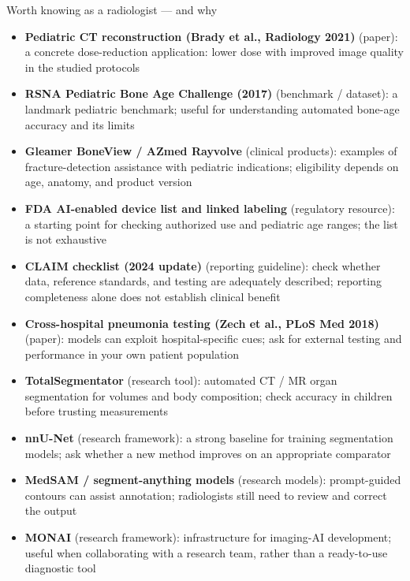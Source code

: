 \documentclass[aspectratio=169]{beamer}
\begin{document}
\begin{frame}{Worth knowing as a radiologist --- and why}
\scriptsize
\begin{itemize}
\item \textbf{Pediatric CT reconstruction (Brady et al., Radiology 2021)} (paper): a concrete dose-reduction application: lower dose with improved image quality in the studied protocols
\item \textbf{RSNA Pediatric Bone Age Challenge (2017)} (benchmark / dataset): a landmark pediatric benchmark; useful for understanding automated bone-age accuracy and its limits
\item \textbf{Gleamer BoneView / AZmed Rayvolve} (clinical products): examples of fracture-detection assistance with pediatric indications; eligibility depends on age, anatomy, and product version
\item \textbf{FDA AI-enabled device list and linked labeling} (regulatory resource): a starting point for checking authorized use and pediatric age ranges; the list is not exhaustive
\item \textbf{CLAIM checklist (2024 update)} (reporting guideline): check whether data, reference standards, and testing are adequately described; reporting completeness alone does not establish clinical benefit
\item \textbf{Cross-hospital pneumonia testing (Zech et al., PLoS Med 2018)} (paper): models can exploit hospital-specific cues; ask for external testing and performance in your own patient population
\item \textbf{TotalSegmentator} (research tool): automated CT / MR organ segmentation for volumes and body composition; check accuracy in children before trusting measurements
\item \textbf{nnU-Net} (research framework): a strong baseline for training segmentation models; ask whether a new method improves on an appropriate comparator
\item \textbf{MedSAM / segment-anything models} (research models): prompt-guided contours can assist annotation; radiologists still need to review and correct the output
\item \textbf{MONAI} (research framework): infrastructure for imaging-AI development; useful when collaborating with a research team, rather than a ready-to-use diagnostic tool
\end{itemize}
\end{frame}
\end{document}
